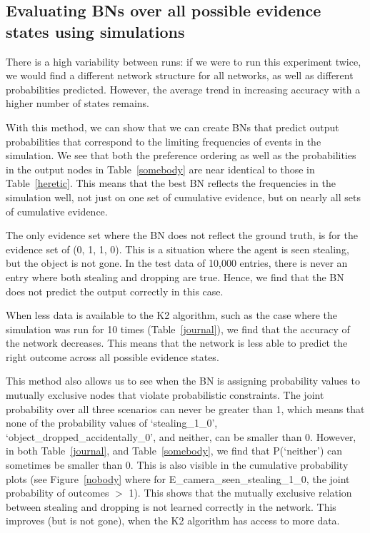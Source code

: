 \documentclass[12pt]{article}
\begin{document}
\subsection{Evaluating BNs over all possible evidence states using simulations}

There is a high variability between runs: if we were to run this experiment twice, we would find a different network structure for all networks, as well as different probabilities predicted. However, the average trend in increasing accuracy with a higher number of states remains.



With this method, we can show that we can create BNs that predict output probabilities that correspond to the limiting frequencies of events in the simulation. We see that both the preference ordering as well as the probabilities in the output nodes in Table~\ref{somebody} are near identical to those in Table~\ref{heretic}. This means that the best BN reflects the frequencies in the simulation well, not just on one set of cumulative evidence, but on nearly all sets of cumulative evidence. 

The only evidence set where the BN does not reflect the ground truth, is for the evidence set of (0, 1, 1, 0). This is a situation where the agent is seen stealing, but the object is not gone. In the test data of 10,000 entries, there is never an entry where both stealing and dropping are true. Hence, we find that the BN does not predict the output correctly in this case. 

When less data is available to the K2 algorithm, such as the case where the simulation was run for 10 times (Table~\ref{journal}), we find that the accuracy of the network decreases. This means that the network is less able to predict the right outcome across all possible evidence states.

This method also allows us to see when the BN is assigning probability values to mutually exclusive nodes that violate probabilistic constraints. The joint probability over all three scenarios can never be greater than 1, which means that none of the probability values of `stealing\_1\_0', `object\_dropped\_accidentally\_0', and neither, can be smaller than 0. However, in both Table~\ref{journal}, and Table~\ref{somebody}, we find that P(`neither') can sometimes be smaller than 0. This is also visible in the cumulative probability plots (see Figure~\ref{nobody} where for E\_camera\_seen\_stealing\_1\_0, the joint probability of outcomes $>$ 1). This shows that the mutually exclusive relation between stealing and dropping is not learned correctly in the network. This improves (but is not gone), when the K2 algorithm has access to more data.
\end{document}
